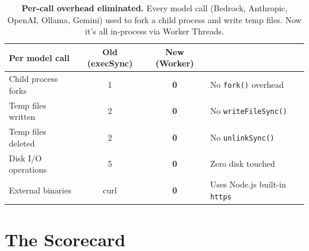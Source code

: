 \documentclass[11pt]{article}
\begin{document}
\begin{table}[H]
\centering
\renewcommand{\arraystretch}{1.3}
\begin{tabular}{@{}l c c l@{}}
\toprule
\textbf{Per model call} & \textbf{Old (execSync)} & \textbf{New (Worker)} & \\
\midrule
Child process forks & 1 & \cellcolor{nativelt}\textbf{0} & No \texttt{fork()} overhead \\
Temp files written & 2 & \cellcolor{nativelt}\textbf{0} & No \texttt{writeFileSync()} \\
Temp files deleted & 2 & \cellcolor{nativelt}\textbf{0} & No \texttt{unlinkSync()} \\
Disk I/O operations & 5 & \cellcolor{nativelt}\textbf{0} & Zero disk touched \\
External binaries & curl & \cellcolor{nativelt}\textbf{0} & Uses Node.js built-in \texttt{https} \\
\bottomrule
\end{tabular}
\caption{\textbf{Per-call overhead eliminated.} Every model call (Bedrock, Anthropic, OpenAI, Ollama, Gemini) used to fork a child process and write temp files. Now it's all in-process via Worker Threads.}
\label{tab:worker}
\end{table}

\section{The Scorecard}
\end{document}
